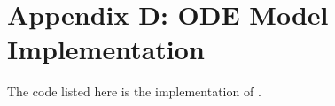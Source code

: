 \chapter{Appendix D: ODE Model Implementation}
\label{AppendixD}

The code listed here is the implementation of . 

